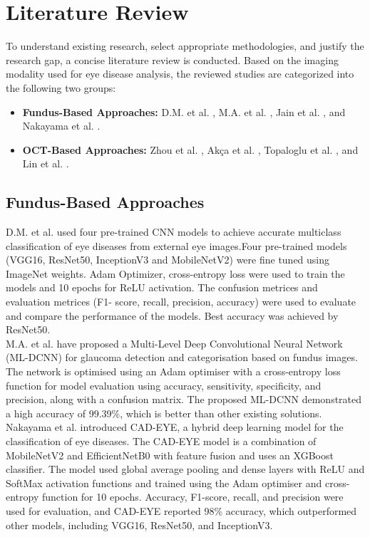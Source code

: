 \documentclass[conference,9pt]{IEEEtran}
\begin{document}
\section{\textbf{Literature Review}}
To understand existing research, select appropriate methodologies, and justify the research gap, a concise literature review is conducted. Based on the imaging modality used for eye disease analysis, the reviewed studies are categorized into the following two groups:

\begin{itemize}
    \item \textbf{Fundus-Based Approaches:}  
    D.M. et al. \cite{1}, M.A. et al. \cite{2}, Jain et al. \cite{16}, and Nakayama et al. \cite{8}.
    
    \item \textbf{OCT-Based Approaches:}  
    Zhou et al. \cite{3}, Akça et al. \cite{4}, Topaloglu et al. \cite{14}, and Lin et al. \cite{17}.
\end{itemize}
\vspace{0.3cm}

\subsection{\textbf{Fundus-Based Approaches}}
D.M. et al. \cite{1} used four pre-trained CNN models to achieve accurate multiclass classification of eye diseases from external eye images.Four pre-trained models (VGG16, ResNet50, InceptionV3 and MobileNetV2) were fine tuned using ImageNet weights. Adam Optimizer, cross-entropy loss were used to train the models and 10 epochs for ReLU activation. The confusion metrices and evaluation metrices (F1- score, recall, precision, accuracy) were used to evaluate and compare the performance of the models. Best accuracy was achieved by ResNet50. \\

M.A. et al. \cite{2} have proposed a Multi-Level Deep Convolutional Neural Network (ML-DCNN) for glaucoma detection and categorisation based on fundus images.
The network is optimised using an Adam optimiser with a cross-entropy loss function for model evaluation using accuracy, sensitivity, specificity, and precision, along with a confusion matrix. The proposed ML-DCNN demonstrated a high accuracy of 99.39\%, which is better than other existing solutions.\\

Nakayama et al. \cite{8} introduced CAD-EYE, a hybrid deep learning model for the classification of eye diseases.
The CAD-EYE model is a combination of MobileNetV2 and EfficientNetB0 with feature fusion and uses an XGBoost classifier. The model used global average pooling and dense layers with ReLU and SoftMax activation functions and trained using the Adam optimiser and cross-entropy function for 10 epochs. Accuracy, F1-score, recall, and precision were used for evaluation, and CAD-EYE reported 98\% accuracy, which outperformed other models, including VGG16, ResNet50, and InceptionV3.\\
\end{document}
